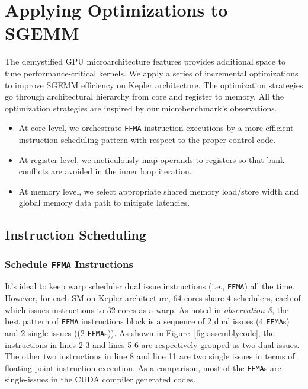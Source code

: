 \documentclass{sig-alternate-05-2015}
\begin{document}
\section{Applying Optimizations to SGEMM }
\label{sec:optimization}
The demystified GPU microarchitecture features provides additional space to tune performance-critical kernels. We apply a series of incremental optimizations to improve SGEMM efficiency on Kepler architecture. The optimization strategies go through architectural hierarchy from core and register to memory. All the optimization strategies are inspired by our microbenchmark's observations.
\begin{itemize}
\item At core level, we orchestrate {\tt FFMA} instruction executions by a more efficient instruction scheduling pattern with respect to the proper control code.
\item At register level, we meticulously map operands to registers so that  bank conflicts are avoided in the inner loop iteration.
\item At memory level, we select appropriate shared memory load/store width and global memory data path to mitigate latencies.
\end{itemize}

\subsection{Instruction Scheduling}
\subsubsection{Schedule {\tt FFMA} Instructions}
It's ideal to keep warp scheduler dual issue instructions (i.e., {\tt FFMA}) all the time. However, for each SM on Kepler architecture, 64 cores share $4$ schedulers, each of which issues instructions to 32 cores as a warp. As noted in {\em observation 3}, the best pattern of {\tt FFMA} instructions block is a sequence of 2 dual issues (4 {\tt FFMA}s) and 2 single issues ((2 {\tt FFMA}s)). As shown in Figure~\ref{fig:assemblycode}, the instructions in lines 2-3 and lines 5-6 are respectively grouped as two dual-issues. The other two instructions in line 8 and line 11 are two single issues in terms of floating-point instruction execution. As a comparison, most of the {\tt FFMA}s are single-issues in the CUDA compiler generated codes.
\end{document}
